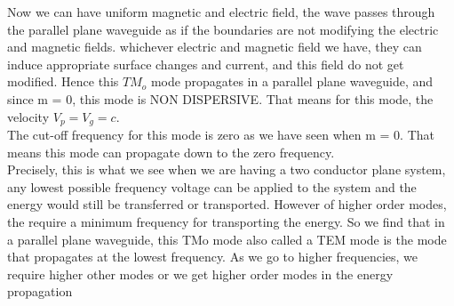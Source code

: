 Now we can have uniform magnetic and electric field, the wave passes through the parallel plane waveguide as if the boundaries are not modifying the electric and magnetic fields. whichever electric and magnetic field we have, they can induce appropriate surface changes and current, and this field do not get modified. Hence this $TM_o$ mode propagates in a parallel plane waveguide, and since m = 0, this mode is NON DISPERSIVE. That means for this mode, the velocity $V_{p}=V_{g}=c$.\\
The cut-off frequency for this mode is zero as we have seen when m = 0. That means this mode can propagate down to the zero frequency.\\
Precisely, this is what we see when we are having a two conductor plane system, any lowest possible frequency voltage can be applied to the system and the energy would still be transferred or transported. However of higher order modes, the require a minimum frequency for transporting the energy. So we find that in a parallel plane waveguide, this TMo mode also called a TEM mode is the mode that propagates at the lowest frequency. As we go to higher frequencies, we require higher other modes or we get higher order modes in the energy propagation\\
